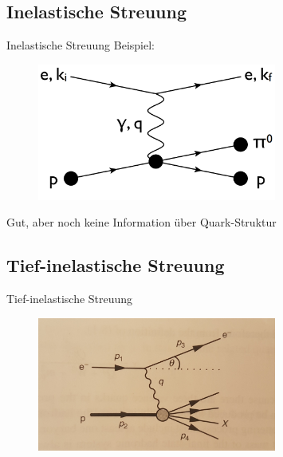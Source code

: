 \documentclass[aspectratio=1610, 9pt]{beamer}
\begin{document}
\subsection{Inelastische Streuung}
\begin{frame}{Inelastische Streuung}
  Beispiel:
  \begin{figure}[H]
  \centering
  \includegraphics[width=0.7\textwidth]{images/inelastic.png}
  \end{figure}
  Gut, aber noch keine Information über Quark-Struktur
\end{frame}

\subsection{Tief-inelastische Streuung}
\begin{frame}{Tief-inelastische Streuung}
\begin{figure}
  \centering
  \includegraphics[width=0.7\textwidth]{images/ep-deep-inelastic-scattering-1.jpg}
\end{figure}
\end{frame}
\end{document}
